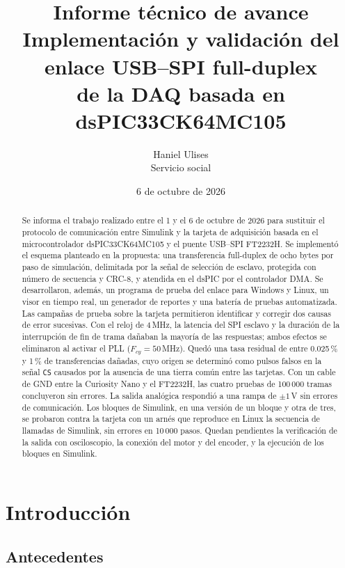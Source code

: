 \documentclass[11pt]{article}
\title{Informe técnico de avance\\[2pt]
       \large Implementación y validación del enlace USB--SPI full-duplex\\
       de la DAQ basada en dsPIC33CK64MC105}
\author{Haniel Ulises\\Servicio social}
\date{6 de octubre de 2026}
\newcommand{\code}[1]{\texttt{#1}}
\begin{document}
\maketitle

\begin{abstract}
Se informa el trabajo realizado entre el 1 y el 6 de octubre de 2026 para
sustituir el protocolo de comunicación entre Simulink y la tarjeta de
adquisición basada en el microcontrolador dsPIC33CK64MC105 y el puente
USB--SPI FT2232H. Se implementó el esquema planteado en la propuesta: una
transferencia full-duplex de ocho bytes por paso de simulación, delimitada
por la señal de selección de esclavo, protegida con número de secuencia y
CRC-8, y atendida en el dsPIC por el controlador DMA. Se desarrollaron,
además, un programa de prueba del enlace para Windows y Linux, un visor en
tiempo real, un generador de reportes y una batería de pruebas automatizada.
Las campañas de prueba sobre la tarjeta permitieron identificar y corregir
dos causas de error sucesivas. Con el reloj de 4\,MHz, la latencia del SPI
esclavo y la duración de la interrupción de fin de trama dañaban la mayoría
de las respuestas; ambos efectos se eliminaron al activar el PLL
($F_{cy} = 50$\,MHz). Quedó una tasa residual de entre 0.025\,\% y 1\,\%
de transferencias dañadas, cuyo origen se determinó como pulsos falsos en la
señal \code{CS} causados por la ausencia de una tierra común entre las
tarjetas. Con un cable de GND entre
la Curiosity Nano y el FT2232H, las cuatro pruebas de 100\,000 tramas
concluyeron sin errores. La salida analógica respondió a una rampa de
$\pm 1$\,V sin errores de comunicación. Los bloques de Simulink, en una
versión de un bloque y otra de tres, se probaron contra la tarjeta con un
arnés que reproduce en Linux la secuencia de llamadas de Simulink, sin
errores en 10\,000 pasos. Quedan pendientes la verificación de la salida con
osciloscopio, la conexión del motor y del encoder, y la ejecución de los
bloques en Simulink.
\end{abstract}

\tableofcontents
\newpage

\section{Introducción}

\subsection{Antecedentes}
\end{document}
